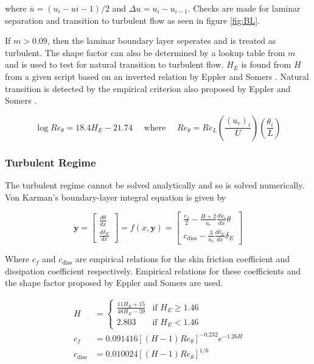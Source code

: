 \documentclass{article}
\begin{document}
where $\bar{u} = (u_{i} - u{i-1})/2$ and $\Delta u = u_i - u_{i-1}$.
Checks are made for laminar separation and transition to turbulent flow as seen in figure \ref{fig:BL}.

If $m > 0.09$, then the laminar boundary layer seperates and is treated as turbulent.
The shape factor can also be determined by a lookup table from $m$ and is used to test for natural transition to turbulent flow.
$H_E$ is found from $H$ from a given script \cite{handout} based on an inverted relation by Eppler and Somers \cite{Eppler_Somers}.
Natural transition is detected by the empirical criterion also proposed by Eppler and Somers \cite{Eppler_Somers}.

\begin{equation}
    \log{Re_\theta} = 18.4 H_E - 21.74 \quad \text{ where } \quad Re_\theta = Re_L\left( \frac{(u_e)_i}{U} \right) \left( \frac{\theta_i}{L} \right)
\end{equation}

\subsubsection{Turbulent Regime}

The turbulent regime cannot be solved analytically and so is solved numerically.
Von Karman's boundary-layer integral equation is given by

\begin{equation}
    \dot{\mathbf{y}} = \begin{bmatrix}
        \frac{d \theta}{d x} \\[5pt]
        \frac{d \delta_E}{d x}
    \end{bmatrix} = f(x,\mathbf{y}) = \begin{bmatrix}
        \frac{c_f}{2} - \frac{H+2}{u_e}\frac{d u_e}{d x} \theta \\[5pt]
        c_\text{diss} - \frac{3}{u_e} \frac{d \delta_E}{d x} \delta_E
    \end{bmatrix}
\end{equation}

Where $c_f$ and $c_\text{diss}$ are empirical relations for the skin friction coefficient and dissipation coefficient respectively.
Empirical relations for these coefficients and the shape factor proposed by Eppler and Somers \cite{Eppler_Somers} are used.

\begin{align}
    H &= \begin{cases}
        \frac{11 H_E + 15}{48H_E - 59} & \text{if } H_E  \ge 1.46 \\
        2.803 & \text{if } H_E < 1.46
    \end{cases} \\
    c_f &= 0.091416\left[(H-1)Re_\theta \right]^{-0.232}e^{-1.26H} \\
    c_\text{diss} &= 0.010024\left[(H-1)Re_\theta \right]^{1/6}
\end{align}
\end{document}
